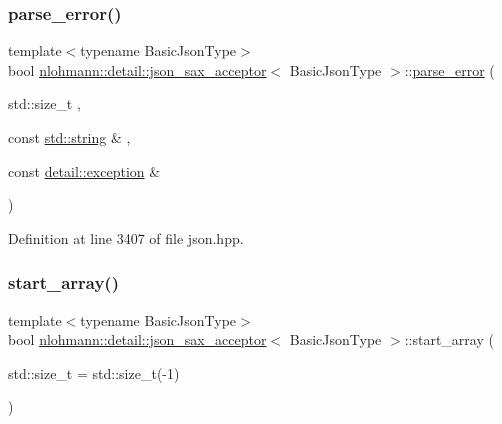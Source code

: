 \subsubsection{\texorpdfstring{parse\_error()}{parse\_error()}}
{\footnotesize\ttfamily template$<$typename Basic\+Json\+Type$>$ \\
bool \mbox{\hyperlink{classnlohmann_1_1detail_1_1json__sax__acceptor}{nlohmann\+::detail\+::json\+\_\+sax\+\_\+acceptor}}$<$ Basic\+Json\+Type $>$\+::\mbox{\hyperlink{classnlohmann_1_1detail_1_1parse__error}{parse\+\_\+error}} (\begin{DoxyParamCaption}\item[{std\+::size\+\_\+t}]{,  }\item[{const \mbox{\hyperlink{namespacenlohmann_1_1detail_a1ed8fc6239da25abcaf681d30ace4985ab45cffe084dd3d20d928bee85e7b0f21}{std\+::string}} \&}]{,  }\item[{const \mbox{\hyperlink{classnlohmann_1_1detail_1_1exception}{detail\+::exception}} \&}]{ }\end{DoxyParamCaption})\hspace{0.3cm}{\ttfamily [inline]}}



Definition at line 3407 of file json.\+hpp.

\mbox{\label{classnlohmann_1_1detail_1_1json__sax__acceptor_a8238e8090cbb4ed8a22cbc97bfb833a5}} 
\subsubsection{\texorpdfstring{start\_array()}{start\_array()}}
{\footnotesize\ttfamily template$<$typename Basic\+Json\+Type$>$ \\
bool \mbox{\hyperlink{classnlohmann_1_1detail_1_1json__sax__acceptor}{nlohmann\+::detail\+::json\+\_\+sax\+\_\+acceptor}}$<$ Basic\+Json\+Type $>$\+::start\+\_\+array (\begin{DoxyParamCaption}\item[{std\+::size\+\_\+t}]{ = {\ttfamily std\+:\+:size\+\_\+t(-\/1)} }\end{DoxyParamCaption})\hspace{0.3cm}{\ttfamily [inline]}}



